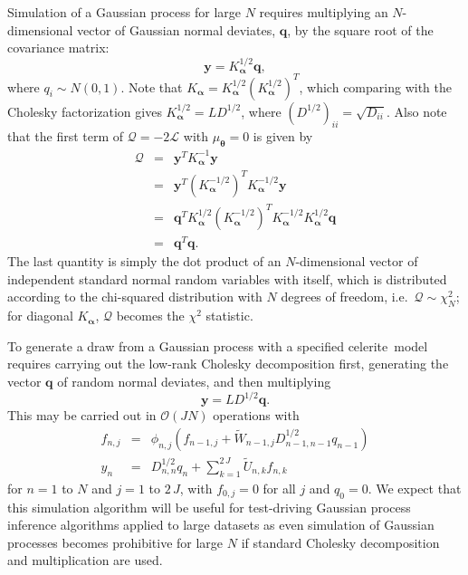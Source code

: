 \documentclass[manuscript, letterpaper]{aastex6}
\newcommand{\project}[1]{\textsf{#1}}
\newcommand{\celerite}{\project{celerite}}
\newcommand{\bvec}[1]{{\ensuremath{\boldsymbol{#1}}}}
\begin{document}
Simulation of a Gaussian process for large $N$ requires multiplying an
$N$-dimensional vector of Gaussian normal deviates, $\bvec{q}$, by the square root
of the covariance matrix:
\begin{equation}
\bvec{y} = K_\bvec{\alpha}^{1/2} \bvec{q},
\end{equation}
where $q_i \sim N(0,1)$.  Note that $K_\bvec{\alpha} = K_\bvec{\alpha}^{1/2} \left(K_\bvec{\alpha}^{1/2}\right)^T$, which
comparing with the Cholesky factorization gives $K_\bvec{\alpha}^{1/2} = L D^{1/2}$,
where $(D^{1/2})_{ii} = \sqrt{D_{ii}}$.  Also note that the first term of $\mathcal{Q} = -2 \mathcal{L}$
with $\mu_\bvec{\theta} =0$ is given by
\begin{eqnarray}
\mathcal{Q} &=&\bvec{y}^T K_\bvec{\alpha}^{-1} \bvec{y}\\
&=& \bvec{y}^T \left(K_\bvec{\alpha}^{-1/2}\right)^T K_\bvec{\alpha}^{-1/2} \bvec{y}\\
&=& \bvec{q}^T K_\bvec{\alpha}^{1/2} \left(K_\bvec{\alpha}^{-1/2}\right)^T K_\bvec{\alpha}^{-1/2} K_\bvec{\alpha}^{1/2} \bvec{q}\\
&=& \bvec{q}^T \bvec{q}.
\end{eqnarray}
The last quantity is simply the dot product of an $N$-dimensional vector of independent standard normal random variables with itself,
which is distributed according to the chi-squared distribution with $N$ degrees of freedom, i.e.\ $\mathcal{Q} \sim \chi_N^2$; for
diagonal $K_\bvec{\alpha}$, $\mathcal{Q}$ becomes the $\chi^2$ statistic.

To generate a draw from a Gaussian process with a specified \celerite\ model requires carrying out the
low-rank Cholesky decomposition first, generating the vector $\bvec{q}$ of random normal deviates, and then multiplying
\begin{equation}
\bvec{y} = L D^{1/2} \bvec{q}.
\end{equation}
This may be carried out in $\mathcal{O}(JN)$ operations with
\begin{eqnarray}
f_{n,j} &=& \phi_{n,j} \left(f_{n-1,j} + \tilde{W}_{n-1,j} D_{n-1,n-1}^{1/2} q_{n-1}\right)\\
y_n &=& D_{n,n}^{1/2} q_n + \sum_{k=1}^{2\,J} \tilde{U}_{n,k} f_{n,k}
\end{eqnarray}
for $n = 1$ to $N$ and $j=1$ to $2\,J$, with $f_{0,j} = 0$ for all $j$ and $q_0 = 0$.
We expect that this simulation algorithm will be useful for test-driving Gaussian
process inference algorithms applied to large datasets as even simulation of
Gaussian processes becomes prohibitive for large $N$ if standard Cholesky decomposition
and multiplication are used.
\end{document}
